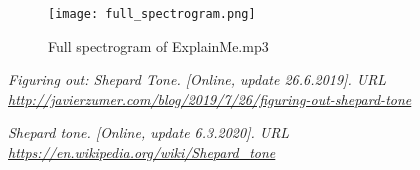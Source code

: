 \documentclass[11pt,a4paper]{article}
\begin{document}


\begin{figure}[!htb]
     \centering
     \texttt{[image: full\_spectrogram.png]}
     \caption{Full spectrogram of ExplainMe.mp3}
     \label{fig:1}
\end{figure}

\begin{thebibliography}{Per00}

	\emph{Figuring out: Shepard Tone. [Online, update 26.6.2019]. URL \url{http://javierzumer.com/blog/2019/7/26/figuring-out-shepard-tone}}
	
	\emph{Shepard tone. [Online, update 6.3.2020]. URL \url{https://en.wikipedia.org/wiki/Shepard\_tone}}
	

\end{thebibliography}
\end{document}
